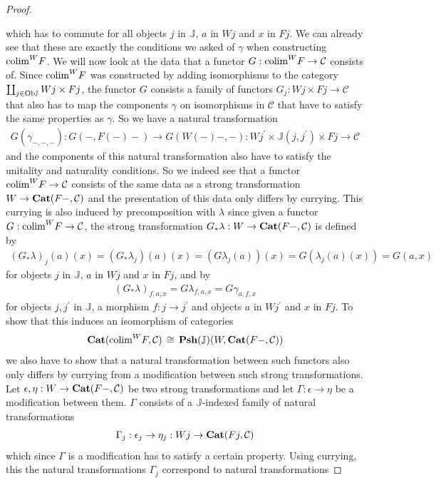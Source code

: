 \documentclass[12pt,oneside,reqno,a4paper]{article}
\theoremstyle{definition}
\newcommand{\Ob}{\textup{Ob}}
\newcommand{\Cat}{\textbf{\textup{Cat}}}
\newcommand{\Psh}[1]{\textbf{\textup{Psh}}(#1)}
\newcommand{\iso}{\,\cong\,}
\newcommand{\C}{\mathcal{C}}
\newcommand{\bJ}{\mathbb{J}}
\newcommand{\p}{^\prime}
\newcommand{\colim}{\textup{colim}}
\begin{document}
\begin{proof}
\begin{center}
\end{center}
which has to commute for all objects $j$ in $\bJ$, $a$ in $Wj$ and $x$ in $Fj$. We can already see that these are exactly the conditions we asked of $\gamma$ when constructing $\colim^W F$. We will now look at the data that a functor $G:\colim^W F\to \C$ consists of. Since $\colim^W F$ was constructed by adding isomorphisms to the category $\coprod_{j \in \Ob\bJ}Wj\times Fj$, the functor $G$ consists a family of functors $G_j:Wj\times Fj\to \C$ that also has to map the components $\gamma$ on isomorphisms in $\C$ that have to satisfy the same properties as $\gamma$. So we have a natural transformation 
\begin{align*}
G(\gamma_{-,-,-}):G(-,F(-)-)\to G(W(-)-,-):Wj\p\times \bJ(j,j\p)\times Fj\to\C
\end{align*}
and the components of this natural transformation also have to satisfy the unitality and naturality conditions. So we indeed see that a functor $\colim^W F\to \C$ consists of the same data as a strong transformation $W\to\Cat(F-,\C)$ and the presentation of this data only differs by currying. This currying is also induced by precomposition with $\lambda$ since given a functor $G:\colim^W F\to \C$, the strong transformation $G_*\lambda:W\to\Cat(F-,\C)$ is defined by
\begin{align*}
(G_*\lambda)_j(a)(x)=(G_*\lambda_j)(a)(x)=(G\lambda_j(a))(x)=G(\lambda_j(a)(x))=G(a,x)
\end{align*}
for objects $j$ in $\bJ$, $a$ in $Wj$ and $x$ in $Fj$, and by
\begin{align*}
(G_*\lambda)_{f,a,x}=G\lambda_{f,a,x}=G\gamma_{a,f,x}
\end{align*}
for objects $j,j\p$ in $\bJ$, a morphism $f:j\to j\p$ and objects $a$ in $Wj\p$ and $x$ in $Fj$. To show that this induces an isomorphism of categories
\begin{align*}
\Cat(\colim^W F,\C)\iso \Psh{\bJ}(W,\Cat(F-,\C))
\end{align*}
we also have to show that a natural transformation between such functors also only differs by currying from a modification between such strong transformations. Let $\epsilon,\eta:W\to \Cat(F-,\C)$ be two strong transformations and let $\Gamma:\epsilon\to\eta$ be a modification between them. $\Gamma$ consists of a $\bJ$-indexed family of natural transformations
\begin{align*}
\Gamma_j:\epsilon_j\to\eta_j:Wj\to\Cat(Fj,\C)
\end{align*}
which since $\Gamma$ is a modification has to satisfy a certain property. Using currying, this the natural transformations $\Gamma_j$ correspond to natural transformations

\end{proof}
\end{document}
